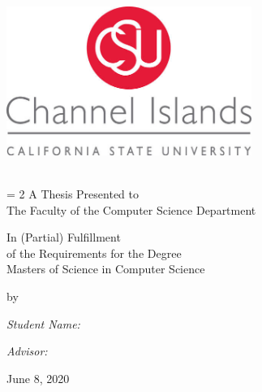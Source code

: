 \begin{titlepage}
\begin{center}
\includegraphics[width=0.60\textwidth]{media/correctlogo.jpg}~\\


\HRule \\[0.5cm]
{\Large \bfseries \thesistitle \par}

\vspace{0.5 cm}

\baselineskip = 2\baselineskip
A Thesis Presented to \\
The Faculty of the Computer Science Department

\vspace{0.5 cm}

In (Partial) Fulfillment\\
of the Requirements for the Degree\\
Masters of Science in Computer Science\\

\vspace{0.5 cm }


by \\

\begin{minipage}{0.4\textwidth}
\begin{flushleft} \small
\emph{Student Name:}\\
\textsc{\studentname}
\end{flushleft}
\end{minipage}
\begin{minipage}{0.4\textwidth}
\begin{flushright} \small
\emph{Advisor:} \\
\textsc{\advisorname}
\end{flushright}
\end{minipage}

June 8, 2020\\
\HRule \\[1.0cm]
\end{center}
\end{titlepage}